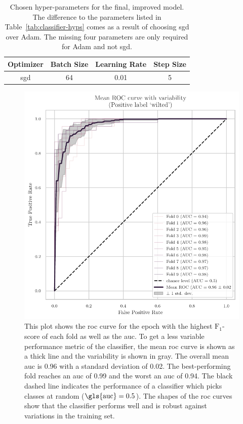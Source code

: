 \documentclass[draft,final]{vutinfth} %
\begin{document}
\begin{table}
  \centering
  \begin{tabular}{cccc}
    \toprule
    Optimizer &  Batch Size & Learning Rate & Step Size \\
    \midrule
    \gls{sgd} & 64 & 0.01 & 5\\
    \bottomrule
  \end{tabular}
  \caption[Hyper-parameters for the optimized classifier.]{Chosen
    hyper-parameters for the final, improved model. The difference to
    the parameters listed in Table~\ref{tab:classifier-hyps} comes as
    a result of choosing \gls{sgd} over Adam. The missing four
    parameters are only required for Adam and not \gls{sgd}.}
  \label{tab:classifier-final-hyps}
\end{table}

\begin{figure}
  \centering
  \includegraphics{graphics/classifier-hyp-folds-roc.pdf}
  \caption[Mean \gls{roc} and variability of hyper-parameter-optimized
  model.]{This plot shows the \gls{roc} curve for the epoch with the
    highest $\mathrm{F}_1$-score of each fold as well as the
    \gls{auc}. To get a less variable performance metric of the
    classifier, the mean \gls{roc} curve is shown as a thick line and
    the variability is shown in gray. The overall mean \gls{auc} is
    0.96 with a standard deviation of 0.02. The best-performing fold
    reaches an \gls{auc} of 0.99 and the worst an \gls{auc} of
    0.94. The black dashed line indicates the performance of a
    classifier which picks classes at random
    ($\mathrm{\gls{auc}} = 0.5$). The shapes of the \gls{roc} curves
    show that the classifier performs well and is robust against
    variations in the training set.}
  \label{fig:classifier-hyp-roc}
\end{figure}
\end{document}
